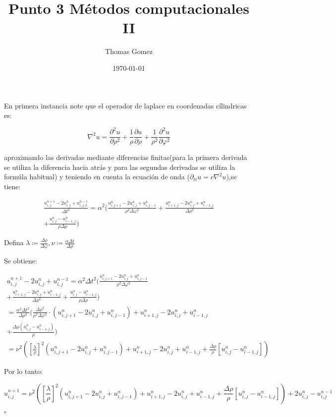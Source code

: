 \documentclass[10pt,a4paper]{article}
\begin{document}
	
	
	\title{Punto 3 Métodos computacionales II}
	\author{Thomas Gomez}
	\date{\today}
	\maketitle
	
	
En primera instancia note que el operador de laplace en coordenadas cílindricas es:

\begin{equation}
\nabla^2 u = \frac{\partial^2 u}{\partial \rho^2} + \frac{1}{\rho}\frac{\partial u}{\partial \rho}+\frac{1}{\rho^2} \frac{\partial^2 u}{\partial \varphi^2}
\end{equation}

aproximando las derivadas mediante diferencias finitas(para la primera derivada se utiliza la diferencia hacia atrás y para las segundas derivadas se utiliza la formúla habitual) y teniendo en cuenta la ecuación de onda ($\partial_{tt} u = c\nabla^2 u $),se tiene:

\begin{equation}
\begin{gathered}
\frac{u_{i,j}^{n+1}-2u_{i,j}^n+u_{i,j,k}^{n-1}}{\Delta t^2} =\alpha^2( \frac{u_{i,j+1}^n-2u_{i,j}^n+u_{i,j-1}^n}{\rho^2 \Delta \varphi^2} + \frac{u_{i+1,j}^n-2u_{i,j}^n+u_{i-1,j}^n}{\Delta \rho^2} \\ + \frac{u_{i,j}^n-u_{i-1,j}^n}{\rho \Delta \rho})
\end{gathered}
\end{equation}

Defina $\lambda \coloneq \frac{\Delta \rho}{\Delta \varphi}, \nu \coloneq \frac{\alpha \Delta t}{\Delta \rho}$

Se obtiene:

\begin{equation}
\begin{gathered}
u_{i,j}^{n+1}-2u_{i,j}^n+u_{i,j}^{n-1} = \alpha^2 \Delta t^2( \frac{u_{i,j+1}^n-2u_{i,j}^n+u_{i,j-1}^n}{\rho^2 \Delta \varphi^2} \\
+ \frac{u_{i+1,j}^n-2u_{i,j}^n+u_{i-1,j}^n}{\Delta \rho^2} + \frac{u_{i,j}^n-u_{i-1,j}^n}{\rho \Delta \rho})\\
= \frac{\alpha^2 \Delta t^2}{ \Delta \rho^2}( \frac{\Delta \rho^2}{\rho^2\Delta \varphi^2} \cdot (u_{i,j+1}^n-2u_{i,j}^n+u_{i,j-1}^n) + u_{i+1,j}^n-2u_{i,j}^n+u_{i-1,j}^n \\ +\frac{\Delta \rho(u_{i,j}^n-u_{i-1,j}^n)}{\rho}) \\
= \nu^2 ( [\frac{\lambda}{\rho}]^2 (u_{i,j+1}^n-2u_{i,j}^n+u_{i,j-1}^n) +  u_{i+1,j}^n-2u_{i,j}^n+u_{i-1,j}^n + \frac{\Delta \rho}{\rho} [ u_{i,j}^n -u_{i-1,j}^n ] )
\end{gathered}
\end{equation}

Por lo tanto:

\begin{equation}
u_{i,j}^{n+1} = \nu^2 ( [\frac{\lambda}{\rho}]^2 (u_{i,j+1}^n-2u_{i,j}^n+u_{i,j-1}^n) +  u_{i+1,j}^n-2u_{i,j}^n+u_{i-1,j}^n + \frac{\Delta \rho}{\rho} [ u_{i,j}^n -u_{i-1,j}^n ] ) + 2u_{i,j}^n-u_{i,j}^{n-1}
\end{equation}

$\square$
\end{document}
